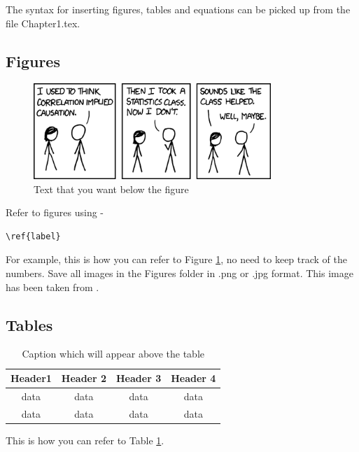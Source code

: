 The syntax for inserting figures, tables and equations can be picked up from the file Chapter1.tex.

\subsection{Figures}

\begin{figure}
\centering
\includegraphics[width=0.8\textwidth]{Figures/xkcd.png}
\caption[Text that you want on the list of figures page]{Text that you want below the figure}
\label{fig:nameForThisFigure}
\end{figure}

Refer to figures using - \begin{verbatim}\ref{label} \end{verbatim} For example, this is how you can refer to Figure \ref{fig:nameForThisFigure}, no need to keep track of the numbers. Save all images in the Figures folder in .png or .jpg format. This image has been taken from \citep{xkcd}.

\subsection{Tables}

\begin{table}
\centering
\caption[Text that you want on the list of tables page]{Caption which will appear above the table}

\begin{tabular}{c|c|c|c}
Header1 & Header 2 & Header 3 & Header 4 \\ \hline
data & data & data & data \\
data & data & data & data \\ \hline
\end{tabular}

\label{tab:nameForThisTable}
\end{table}
 
This is how you can refer to Table \ref{tab:nameForThisTable}.

